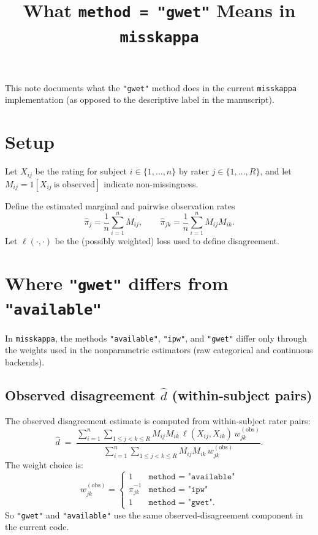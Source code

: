\documentclass[11pt]{article}
\title{What \texttt{method = "gwet"} Means in \texttt{misskappa}}
\date{}
\begin{document}
\maketitle

This note documents what the \texttt{"gwet"} method does in the current
\texttt{misskappa} implementation (as opposed to the descriptive label in the
manuscript).

\section*{Setup}

Let $X_{ij}$ be the rating for subject $i \in \{1,\dots,n\}$ by rater
$j \in \{1,\dots,R\}$, and let $M_{ij} = 1[X_{ij}\ \text{is observed}]$ indicate
non-missingness.

Define the estimated marginal and pairwise observation rates
\[
  \hat\pi_j = \frac{1}{n}\sum_{i=1}^n M_{ij},
  \qquad
  \hat\pi_{jk} = \frac{1}{n}\sum_{i=1}^n M_{ij}M_{ik}.
\]
Let $\ell(\cdot,\cdot)$ be the (possibly weighted) loss used to define
disagreement.

\section*{Where \texttt{"gwet"} differs from \texttt{"available"}}

In \texttt{misskappa}, the methods \texttt{"available"}, \texttt{"ipw"}, and
\texttt{"gwet"} differ only through the weights used in the nonparametric
estimators (raw categorical and continuous backends).

\subsection*{Observed disagreement $\hat d$ (within-subject pairs)}

The observed disagreement estimate is computed from within-subject rater pairs:
\[
  \hat d
  \;=\;
  \frac{
    \sum_{i=1}^n \sum_{1\le j<k\le R} M_{ij}M_{ik}\,\ell(X_{ij},X_{ik})\,w^{(\mathrm{obs})}_{jk}
  }{
    \sum_{i=1}^n \sum_{1\le j<k\le R} M_{ij}M_{ik}\,w^{(\mathrm{obs})}_{jk}
  }.
\]
The weight choice is:
\[
  w^{(\mathrm{obs})}_{jk} =
  \begin{cases}
    1 & \texttt{method = "available"} \\
    \hat\pi_{jk}^{-1} & \texttt{method = "ipw"} \\
    1 & \texttt{method = "gwet"}.
  \end{cases}
\]
So \texttt{"gwet"} and \texttt{"available"} use the same observed-disagreement
component in the current code.
\end{document}

